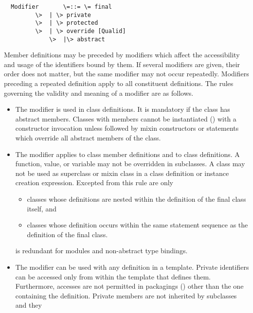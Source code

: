 \documentclass[11pt]{report}
\newcommand{\ifqualified}[1]{}
\newcommand{\iffinaltype}[1]{}
\begin{document}
\syntax\begin{verbatim}
  Modifier       \=::= \= final
		 \>  | \> private
		 \>  | \> protected
		 \>  | \> override [Qualid]
	         \>  |\> abstract
\end{verbatim}

Member definitions may be preceded by modifiers which
affect the \ifqualified{qualified names, }accessibility and usage of the identifiers
bound by them.  If several modifiers are given, their order does not
matter, but the same modifier may not occur repeatedly.  Modifiers
preceding a repeated definition apply to all constituent definitions.
The rules governing the validity and meaning of a modifier are as
follows.
\begin{itemize}
\item
The \verb@abstract@ modifier is used in class definitions. It is
mandatory if the class has abstract members.  Classes with
\verb@abstract@ members cannot be instantiated
() with a constructor invocation unless
followed by mixin constructors or statements which override all
abstract members of the class.
\item
The \verb@final@ modifier applies to class member definitions and to
class definitions. A \verb@final@ function, value, or variable may not
be overridden in subclasses.  A
\verb@final@ class may
not be used as superclass or mixin class in a class definition or
instance creation expression.
Excepted from this rule are only
\begin{itemize}
\item classes whose definitions are nested within the definition
of the final class itself, and
\item classes whose definition occurs within the same statement
sequence as the definition of the final class.
\end{itemize}
\iffinaltype{
A non-abstract final class is also called a {\em
leaf class}.  When used in a binding of an abstract type, \verb@final@
restricts the possible instances of the abstract type to leaf
classes (see also \sref{sec:typedcl}).
}
\verb@final@ is redundant for modules and non-abstract type bindings.
\item
The \verb@private@ modifier can be used with any definition in a
template. Private identifiers can be accessed only from within the template
that defines them.  Furthermore, accesses are not permitted in
packagings () other than the one containing the
definition. Private members are not inherited by subclasses and they

\end{itemize}
\end{document}
